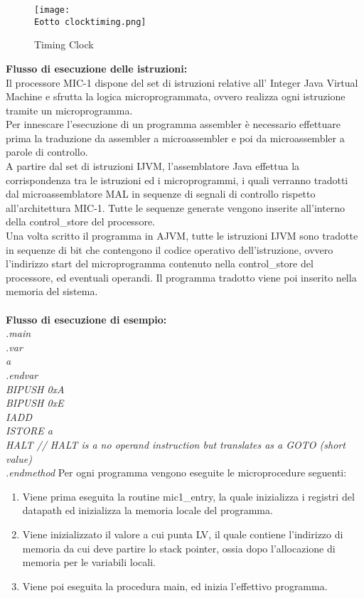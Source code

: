 \documentclass[12pt]{article}
\def \Eotto {Allegati/Esercizio8/}
\begin{document}
\begin{figure}[ht!]
    \centering
    \texttt{[image: \\Eotto clocktiming.png]}
    \caption{Timing Clock}
\end{figure}
\clearpage
{\large \textbf{Flusso di esecuzione delle istruzioni:}}
\\Il processore MIC-1 dispone del set di istruzioni relative all’ Integer Java Virtual Machine e sfrutta la logica microprogrammata, ovvero realizza ogni istruzione tramite un microprogramma.
\\Per innescare l’esecuzione di un programma assembler è necessario effettuare prima la traduzione da assembler a microassembler e poi da microassembler a parole di controllo.
\\A partire dal set di istruzioni IJVM, l’assemblatore Java effettua la corrispondenza tra le istruzioni ed i microprogrammi, i quali verranno tradotti dal microassemblatore MAL in sequenze di segnali di controllo rispetto all’architettura MIC-1. Tutte le sequenze generate vengono inserite all’interno della control\_store del processore.
\\Una volta scritto il programma in AJVM, tutte le istruzioni IJVM sono tradotte in sequenze di bit che contengono il codice operativo dell'istruzione, ovvero l’indirizzo start del microprogramma contenuto nella control\_store del processore, ed eventuali operandi. Il programma tradotto viene poi inserito nella memoria del sistema.
\\\\{\large \textbf{Flusso di esecuzione di esempio:}}
\textit{
    \\.main
    \\  .var
    \\a
    \\.endvar
    \\BIPUSH 0xA
    \\BIPUSH 0xE
    \\IADD
    \\ISTORE a
    \\HALT // HALT is a no operand instruction but translates as a GOTO (short value)
    \\.endmethod
}
\clearpage
Per ogni programma vengono eseguite le microprocedure seguenti:
\begin{enumerate}
    \item Viene prima eseguita la routine mic1\_entry, la quale inizializza i registri del datapath ed inizializza la memoria locale del programma.
    \item Viene inizializzato il valore a cui punta LV, il quale contiene l'indirizzo di memoria da cui deve partire lo stack pointer, ossia dopo l'allocazione di memoria per le variabili locali.
    \item Viene poi eseguita la procedura main, ed inizia l'effettivo programma.
\end{enumerate}
\end{document}
